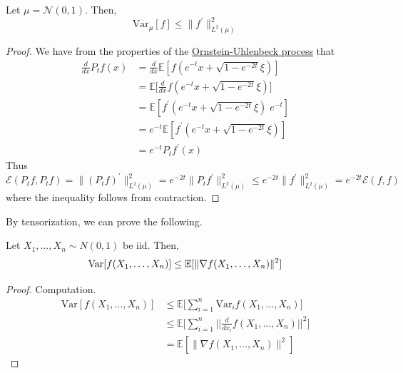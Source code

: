   \begin{theorem}
    \label{thm:gaussian-poincare-inequality-2}
  Let $\mu = \mathcal{N}(0, 1)$. Then, 
  \begin{equation}
    \mathrm{Var}_\mu [f] \leq \|f^\prime\|_{L^2(\mu)}^2
  \end{equation}
  \end{theorem}
  \begin{proof}
  We have from the properties of the \hyperref[def:ornstein-uhlenbeck-process]{Ornstein-Uhlenbeck process} that
  \begin{align*}
      \frac{d}{dx} P_t f(x) & = \frac{d}{dx} \mathbb{E}[ f(e^{-t} x + \sqrt{1 - e^{-2t}} \xi)] \\
      & = \mathbb{E} \bigg[ \frac{d}{dx} f(e^{-t} x + \sqrt{1 - e^{-2t}} \xi)] \\
      & = \mathbb{E}[f^\prime (e^{-t} x + \sqrt{1 - e^{-2t}} \xi) \; e^{-t}] \\
      & = e^{-t} \mathbb{E}[f^\prime (e^{-t} x + \sqrt{1 - e^{-2t}} \xi)] \\
      & = e^{-t} P_t f^\prime (x) 
  \end{align*}
  Thus
  \begin{equation}
    \mathcal{E}(P_t f, P_t f) = \|(P_t f)^\prime\|_{L^2 (\mu)}^2 = e^{-2t} \| P_t f^\prime \|^2_{L^2(\mu)} \leq e^{-2t} \|f^\prime\|^2_{L^2(\mu)} = e^{-2t} \mathcal{E}(f, f)
  \end{equation}
  where the inequality follows from contraction. 
  \end{proof}

  By tensorization, we can prove the following. 

  \begin{corollary}
    \label{thm:gaussian-poincare-inequality}
  Let $X_1, \ldots, X_n \sim N(0, 1)$ be iid. Then, 
  \begin{equation}
    \operatorname{Var}[ f(X_1, \ldots, X_n)] \leq \mathbb{E}[ \| \nabla f (X_1, \ldots, X_n)\|^2 ]
  \end{equation}
  \end{corollary}
  \begin{proof}
  Computation. 
  \begin{align*}
      \mathrm{Var}[f(X_1, \ldots, X_n)] & \leq \mathbb{E} \bigg[ \sum_{i=1}^n \mathrm{Var}_i f(X_1, \ldots, X_n) \bigg] \\
      & \leq \mathbb{E} \bigg[ \sum_{i=1}^n \bigg| \bigg| \frac{d}{dx_i} f(X_1, \ldots, X_n)\bigg|\bigg|^2 \bigg] \\
      & = \mathbb{E}[ \|\nabla f (X_1, \ldots, X_n) \|^2 ]
  \end{align*}
  \end{proof}

